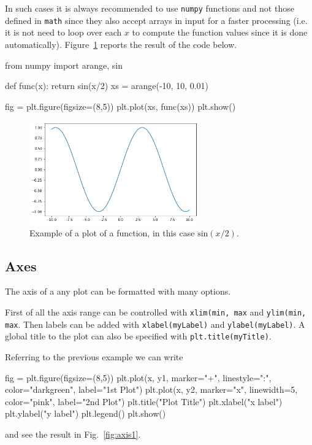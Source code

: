 \begin{ipython}
In such cases it is always recommended to use \texttt{numpy} functions
and not those defined in \texttt{math} since they also accept arrays in
input for a faster processing (i.e. it is not need to loop over each
\(x\) to compute the function values since it is done automatically).
Figure~\ref{fig:sinx_x} reports the result of the code below.

\begin{ipython}
from numpy import arange, sin

def func(x):
    return sin(x/2)
xs = arange(-10, 10, 0.01)

fig = plt.figure(figsize=(8,5))
plt.plot(xs, func(xs))
plt.show()
\end{ipython}

\begin{figure}[htb]
	\centering
	\includegraphics[width=0.65\textwidth]{figures/sinx_x}
	\caption{Example of a plot of a function, in this case \(\mathrm{sin}(x/2)\).}
	\label{fig:sinx_x}
\end{figure}

\subsection{Axes}\label{axes}

The axis of a any plot can be formatted with many options.

First of all the axis range can be controlled with
\texttt{xlim(min, max} and \texttt{ylim(min, max}. Then labels can be
added with \texttt{xlabel(myLabel)} and \texttt{ylabel(myLabel)}. A
global title to the plot can also be specified with
\texttt{plt.title(myTitle)}.

Referring to the previous example we can write

\begin{ipython}
fig = plt.figure(figsize=(8,5))
plt.plot(x, y1, marker="+", linestyle=":", color="darkgreen", label="1st Plot")
plt.plot(x, y2, marker="x", linewidth=5, color="pink", label="2nd Plot")
plt.title("Plot Title")
plt.xlabel("x label")
plt.ylabel("y label")
plt.legend()
plt.show()
\end{ipython}
\noindent
and see the result in Fig.~\ref{fig:axis1}.


\end{ipython}
